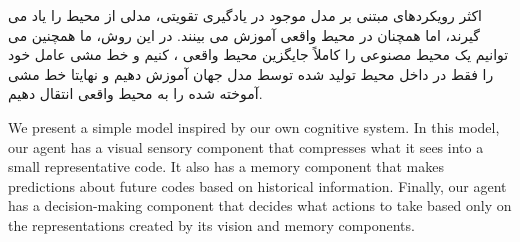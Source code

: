 اکثر رویکردهای مبتنی بر مدل موجود در یادگیری تقویتی، مدلی از محیط را یاد می گیرند، اما همچنان در محیط واقعی آموزش می بینند. در این روش، ما همچنین می توانیم یک محیط  مصنوعی را کاملاً جایگزین محیط واقعی ، کنیم و خط مشی عامل خود را فقط در داخل محیط تولید شده توسط مدل جهان آموزش دهیم و نهایتا خط مشی آموخته شده را به محیط واقعی انتقال دهیم.

We present a simple model inspired by our own cognitive system. In this model, our agent has a visual sensory component that compresses what it sees into a small representative code. It also has a memory component that makes predictions about future codes based on historical information. Finally, our agent has a decision-making component that decides what actions to take based only on the representations created by its vision and memory components.